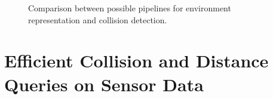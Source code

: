 \begin{figure}[htbp]
\caption[Comparison between possible pipelines for environment representation and collision detection]{\label{fig:8:pipelines} Comparison between possible pipelines for environment representation and collision detection.}
\end{figure}


\section{Efficient Collision and Distance Queries on Sensor Data}
\label{sec:8:algorithm}

